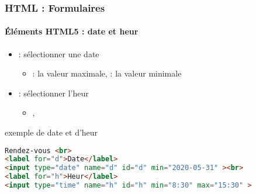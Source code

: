 \documentclass[xcolor=table]{beamer}
\begin{document}
\begin{frame}[fragile]
\frametitle{HTML : Formulaires}
\framesubtitle{Éléments HTML5 : date et heur}

\begin{itemize}
	\item {} : sélectionner une date 
	\begin{itemize}
		\item {} : la valeur maximale,  : la valeur minimale 
	\end{itemize}
	\item {} : sélectionner l'heur
	\begin{itemize}
		\item {}, 
	\end{itemize}
\end{itemize}

\begin{exampleblock}{exemple de date et d'heur}
\lstset{escapeinside=**}
\scriptsize\bfseries\vspace{-6pt}
\begin{lstlisting}[language={html}]
Rendez-vous <br>
<label for="d">Date</label>
<input type="date" name="d" id="d" min="2020-05-31" ><br>
<label for="h">Heur</label>
<input type="time" name="h" id="h" min="8:30" max="15:30" >
\end{lstlisting}\vspace{-6pt}
\end{exampleblock}

\end{frame}
\end{document}
